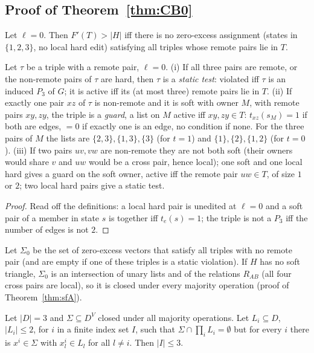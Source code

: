 \subsection{Proof of Theorem~\ref{thm:CB0}}\label{app:softCB}
Let $\ell=0$. Then $F'(T)>|H|$ iff there is no zero-excess assignment (states in $\{1,2,3\}$, no local hard edit) satisfying all triples whose remote pairs lie in $T$.
\begin{lemma}[Guards]\label{lem:guards}
Let $\tau$ be a triple with a remote pair, $\ell=0$. (i) If all three pairs are remote, or the non-remote pairs of $\tau$ are hard, then $\tau$ is a \emph{static test}: violated iff $\tau$ is an induced $P_3$ of $G$; it is active iff its (at most three) remote pairs lie in $T$. (ii) If exactly one pair $xz$ of $\tau$ is non-remote and it is soft with owner $M$, with remote pairs $xy,zy$, the triple is a \emph{guard}, a list on $M$ active iff $xy,zy\in T$: $t_{xz}(s_M)=1$ if both are edges, $=0$ if exactly one is an edge, no condition if none. For the three pairs of $M$ the lists are $\{2,3\},\{1,3\},\{3\}$ (for $t=1$) and $\{1\},\{2\},\{1,2\}$ (for $t=0$). (iii) If two pairs $uv,vw$ are non-remote they are not both soft (their owners would share $v$ and $uw$ would be a cross pair, hence local); one soft and one local hard gives a guard on the soft owner, active iff the remote pair $uw\in T$, of size $1$ or $2$; two local hard pairs give a static test.
\end{lemma}
\begin{proof}
Read off the definitions: a local hard pair is unedited at $\ell=0$ and a soft pair of a member in state $s$ is together iff $t_e(s)=1$; the triple is not a $P_3$ iff the number of edges is not $2$.
\end{proof}
Let $\Sigma_0$ be the set of zero-excess vectors that satisfy all triples with no remote pair (and are empty if one of these triples is a static violation). If $H$ has no soft triangle, $\Sigma_0$ is an intersection of unary lists and of the relations $R_{AB}$ (all four cross pairs are local), so it is closed under every majority operation (proof of Theorem~\ref{thm:sfA}).
\begin{lemma}\label{lem:sfH}
Let $|D|=3$ and $\Sigma\subseteq D^V$ closed under all majority operations. Let $L_i\subseteq D$, $|L_i|\le2$, for $i$ in a finite index set $I$, such that $\Sigma\cap\prod_iL_i=\emptyset$ but for every $i$ there is $x^i\in\Sigma$ with $x^i_l\in L_l$ for all $l\ne i$. Then $|I|\le3$.
\end{lemma}
